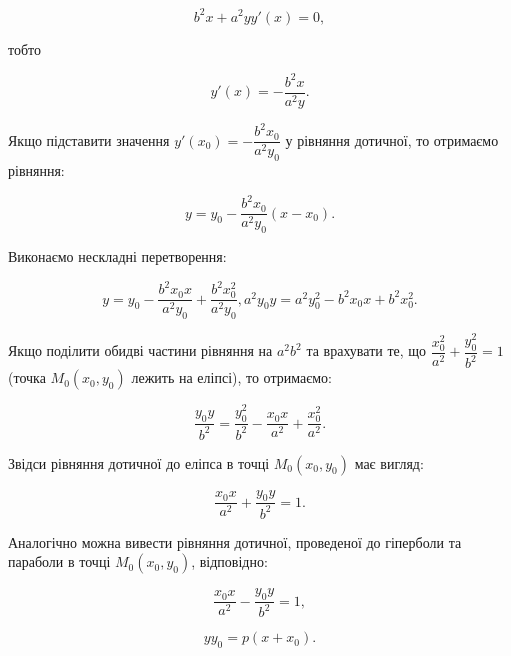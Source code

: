 $$b^2x + a^2yy'(x) = 0,$$

\begin{center}
тобто 
\end{center}

$$y'(x) = -\dfrac{b^2x}{a^2y}.$$

Якщо підставити значення $y'(x_0) = -\dfrac{b^2x_0}{a^2y_0}$
у рівняння дотичної, то отримаємо рівняння:

$$y = y_0 -\dfrac{b^2x_0}{a^2y_0}(x - x_0).$$

Виконаємо нескладні перетворення:

$$y = y_0 -\dfrac{b^2x_0x}{a^2y_0} +\dfrac{b^2x_0^2}{a^2y_0}, a^2y_0y = a^2y_0^2 - b^2x_0x + b^2x_0^2.$$

Якщо поділити обидві частини рівняння на $a^2b^2$ та врахувати те, що
$\dfrac{x_0^2}{a^2} + \dfrac{y_0^2}{b^2} = 1$ (точка $M_0(x_0,y_0)$ лежить на еліпсі), то отримаємо:

$$\dfrac{y_0y}{b^2} = \dfrac{y_0^2}{b^2} - \dfrac{x_0x}{a^2} + \dfrac{x_0^2}{a^2}.$$

Звідси рівняння дотичної до еліпса в точці $M_0(x_0,y_0)$ має вигляд:

$$\dfrac{x_0x}{a^2} + \dfrac{y_0y}{b^2} = 1.$$

Аналогічно можна вивести рівняння дотичної, проведеної до гіперболи та
параболи в точці $M_0(x_0,y_0)$, відповідно: 

$$\dfrac{x_0x}{a^2} - \dfrac{y_0y}{b^2} = 1,$$

$$yy_0 = p(x + x_0).$$





